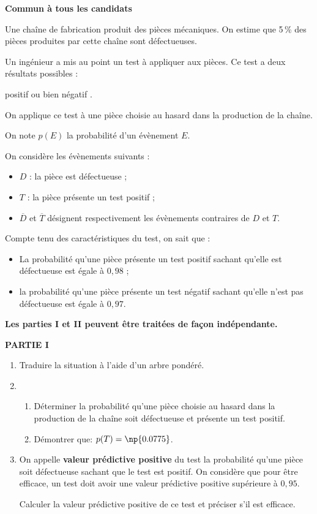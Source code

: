 
\textbf{Commun à tous les candidats}
\medskip

Une chaîne de fabrication produit des pièces mécaniques. On estime que 5\,\% des pièces
produites par cette chaîne sont défectueuses.

Un ingénieur a mis au point un test à appliquer aux pièces. Ce test a deux résultats possibles :

\og positif \fg{} ou bien \og négatif \fg.

On applique ce test à une pièce choisie au hasard dans la production de la chaîne.

On note $p(E)$ la probabilité d'un évènement $E$.

On considère les évènements suivants :

\begin{itemize}
\item $D$ : \og la pièce est défectueuse \fg{} ;
\item $T$ : \og la pièce présente un test positif \fg {};
\item $\overline{D}$ et $\overline{T}$ désignent respectivement les évènements contraires de $D$ et $T$.
\end{itemize}

Compte tenu des caractéristiques du test, on sait que :
\begin{itemize}
\item La probabilité qu'une pièce présente un test positif sachant qu'elle est défectueuse est égale à $0,98$ ;
\item la probabilité qu'une pièce présente un test négatif sachant qu'elle n'est pas
défectueuse est égale à $0,97$.
\end{itemize}
\medskip
\begin{center}
\textbf{Les parties I et II peuvent être traitées de façon indépendante.}
\end{center}

\medskip

\textbf{PARTIE I}

\medskip

\begin{enumerate}
\item Traduire la situation à l'aide d'un arbre pondéré.
\item \begin{enumerate}
\item Déterminer la probabilité qu'une pièce choisie au hasard dans la production de la
chaîne soit défectueuse et présente un test positif.
\item Démontrer que: $p(T) = \np{0.0775}$.
\end{enumerate}
\item On appelle \textbf{valeur prédictive positive} du test la probabilité qu'une pièce soit
défectueuse sachant que le test est positif. On considère que pour être efficace, un
test doit avoir une valeur prédictive positive supérieure à $0,95$.

Calculer la valeur prédictive positive de ce test et préciser s'il est efficace.
\end{enumerate}
\medskip

